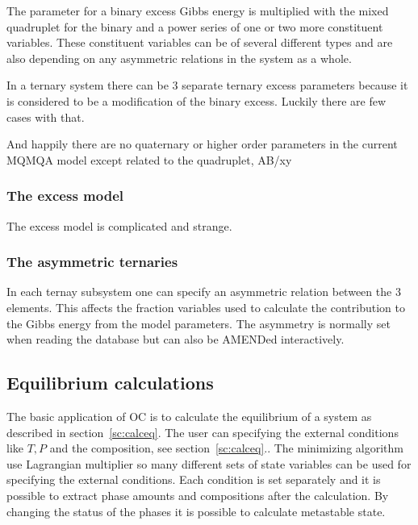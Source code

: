 \documentclass[11pt]{article}
\begin{document}
The parameter for a binary excess Gibbs energy is multiplied with the
mixed quadruplet for the binary and a power series of one or two more
constituent variables.  These constituent variables can be of several
different types and are also depending on any asymmetric relations in
the system as a whole.

In a ternary system there can be 3 separate ternary excess parameters
because it is considered to be a modification of the binary excess.
Luckily there are few cases with that.

And happily there are no quaternary or higher order parameters in the
current MQMQA model except related to the quadruplet, AB/xy

\hypertarget{Info MQMQA excess}{}
\subsubsection{The excess model}\label{sc:mqmqa_excess}

The excess model is complicated and strange.

\hypertarget{Info MQMQA asymmetry}{}
\subsubsection{The asymmetric ternaries}\label{sc:mqmqa-asymmetry}

In each ternay subsystem one can specify an asymmetric relation
between the 3 elements.  This affects the fraction variables used to
calculate the contribution to the Gibbs energy from the model
parameters.  The asymmetry is normally set when reading the database
but can also be AMENDed interactively.

\hypertarget{Info equilibrium}{}
\subsection{Equilibrium calculations}\label{sc:equilibrium}

The basic application of OC is to calculate the equilibrium of a
system as described in section~\ref{sc:calceq}.  The user can
specifying the external conditions like $T, P$ and the composition,
see section~\ref{sc:calceq}..  The minimizing algorithm~\cite{15Sun2}
use Lagrangian multiplier so many different sets of state variables
can be used for specifying the external conditions. Each condition is
set separately and it is possible to extract phase amounts and
compositions after the calculation.  By changing the status of the
phases it is possible to calculate metastable state.
\end{document}
